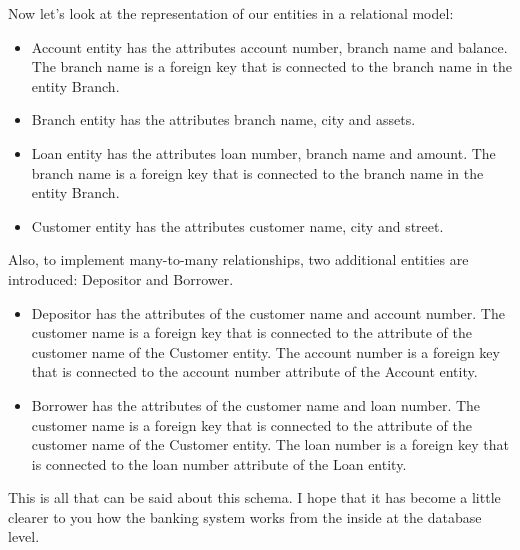 \documentclass[a4paper, 14pt]{extarticle}
\begin{document}
Now let's look at the representation of our entities in a relational model:
\begin{itemize}
  \item Account entity has the attributes account number, branch name and
  balance. The branch name is a foreign key that is connected to the branch name
  in the entity Branch.
  \item Branch entity has the attributes branch name, city and assets.
  \item Loan entity has the attributes loan number, branch name and amount. The
  branch name is a foreign key that is connected to the branch name in the
  entity Branch.
  \item Customer entity has the attributes customer name, city and street.
\end{itemize}

Also, to implement many-to-many relationships, two additional
entities are introduced: Depositor and Borrower.
\begin{itemize}
  \item Depositor has the attributes of the customer name and account number.
  The customer name is a foreign key that is connected to the attribute of the
  customer name of the Customer entity. The account number is a foreign key that
  is connected to the account number attribute of the Account entity.
  \item Borrower has the attributes of the customer name and loan number. The
  customer name is a foreign key that is connected to the attribute of the
  customer name of the Customer entity. The loan number is a foreign key that is
  connected to the loan number attribute of the Loan entity.
\end{itemize}

This is all that can be said about this schema. I hope that it has become a
little clearer to you how the banking system works from the inside at the
database level.
\end{document}
